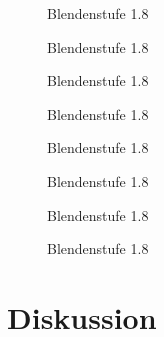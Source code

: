 \begin{figure}
	\centering
	
	\caption{Blendenstufe \num{1.8}}
\end{figure}
\begin{figure}
	\centering
	
	\caption{Blendenstufe \num{1.8}}
\end{figure}
\begin{figure}
	\centering
	
	\caption{Blendenstufe \num{1.8}}
\end{figure}
\begin{figure}
	\centering
	
	\caption{Blendenstufe \num{1.8}}
\end{figure}
\begin{figure}
	\centering
	
	\caption{Blendenstufe \num{1.8}}
\end{figure}
\begin{figure}
	\centering
	
	\caption{Blendenstufe \num{1.8}}
\end{figure}
\begin{figure}
	\centering
	
	\caption{Blendenstufe \num{1.8}}
\end{figure}
\begin{figure}
	\centering
	
	\caption{Blendenstufe \num{1.8}}
\end{figure}

\newpage
\section{Diskussion} 
